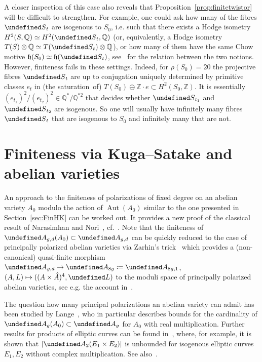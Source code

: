\documentclass[11pt]{article}
\theoremstyle{definition}
\numberwithin{equation}{section}
\numberwithin{figure}{section}
\numberwithin{table}{section}
\let\cal\undefined
\DeclareMathOperator{\Aut}{Aut}
\newcommand{\cal}{\mathcal}
\newcommand{\ka}{{\cal A}}
\newcommand{\kl}{{\cal L}}
\newcommand{\ks}{{\cal S}}
\newcommand{\ZZ}{\mathbb{Z}}
\newcommand{\QQ}{\mathbb{Q}}
\newcommand{\hh}{\mathfrak{h}}
\renewcommand{\cong}{\simeq}
\begin{document}
A closer inspection of this case also reveals that Proposition~\ref{prop:finitetwistor} will be difficult to strengthen. For example, one could ask how many of the fibres $\ks_t$ are isogenous to $S_0$, i.e. such that there exists a Hodge isometry $H^2(S,\QQ)\cong H^2(\ks_t,\QQ)$ (or, equivalently, a Hodge isometry $T(S)\otimes\QQ\cong T(\ks_t)\otimes\QQ$), or how many of them have the same Chow motive $\hh(S_0)\cong \hh(\ks_t)$, see~\cite{HuyMot} for the relation between the two notions. However, finiteness fails in these settings. Indeed, for $\rho(S_0)=20$ the projective fibres $\ks_t$ are up to conjugation uniquely determined by primitive classes $e_t$ in (the saturation~of) $T(S_0)\oplus\ZZ\cdot e\subset H^2(S_0,\ZZ)$. It is essentially $(e_{t_1})^2/(e_{t_2})^2\in\QQ^\ast/\QQ^{\ast2}$ that decides whether $\ks_{t_1}$ and $\ks_{t_2}$ are isogenous. So one will usually have infinitely many fibres $\ks_t$ that are isogenous to $S_0$ and infinitely many that are not.


\section{Finiteness via Kuga--Satake and abelian varieties}\label{sec:KS}

An approach to the finiteness of polarizations of fixed degree on an abelian variety $A_0$ modulo the action of $\Aut(A_0)$ similar to the one presented in Section~\ref{sec:FinHK} can be worked out. It provides a new proof of the classical result of Narasimhan and Nori~\cite{NarNor}, cf.~\cite[Section~18]{Milne}. Note that the finiteness of $\ka_{g,d}(A_0)\subset \ka_{g,d}$ can be quickly reduced to the case of principally polarized abelian varieties via Zarhin's trick~\cite{Zarhin} which provides a (non-canonical) quasi-finite morphism $\ka_{g,d}\to\ka_{8g}\coloneqq\ka_{8g,1}$, $(A,L)\mapsto ((A\times \hat A)^4,\kl)$ to the moduli space of principally polarized abelian varieties, see e.g. the account in~\cite[Section~4.1]{OS}.

The question how many principal polarizations an abelian variety can admit has been studied by Lange~\cite{La}, who in particular describes bounds for the cardinality of $\ka_g(A_0)\subset \ka_g$ for $A_0$ with real multiplication. Further results for products of elliptic curves can be found in~\cite{Hay,La2}, where, for example, it is shown that $|\ka_2(E_1\times E_2)|$ is unbounded for isogenous elliptic curves $E_1,E_2$ without complex multiplication. See also~\cite{Howe1,Howe2}.
\end{document}
